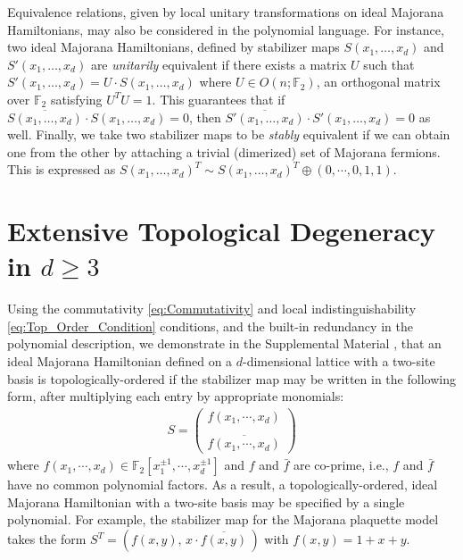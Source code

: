 \documentclass[aps,twocolumn,preprintnumbers,floatfix,showpacs,prx]{revtex4-1}
\begin{document}
Equivalence relations, given by local unitary transformations on ideal Majorana Hamiltonians,
may also be considered in the polynomial language.
For instance, two ideal Majorana Hamiltonians,
defined by stabilizer maps $S(x_1,\ldots,x_d)$ and $S'(x_1,\ldots,x_d)$
are \emph{unitarily} equivalent if there exists a matrix $U$
such that $S'(x_1,\ldots,x_d) = U \cdot S(x_1,\ldots,x_d)$
where $U \in O(n; \mathbb{F}_{2})$, an orthogonal matrix over $\mathbb{F}_{2}$
satisfying $U^T U = 1$.
This guarantees that if $\overline{S(x_{1},\ldots,x_{d})} \cdot S(x_{1},\ldots,x_{d}) = 0$,
then $\overline{S'(x_{1},\ldots,x_{d})}\cdot S'(x_{1},\ldots,x_{d}) = 0$ as well.
Finally, we take two stabilizer maps to be \emph{stably} equivalent
if we can obtain one from the other by attaching a trivial (dimerized) set of Majorana fermions.
This is expressed as $S(x_{1},\ldots,x_{d})^{T} \sim S(x_{1},\ldots,x_{d})^{T} \oplus \left(0,\cdots,0,1,1\right)$.


\section{Extensive Topological Degeneracy in $d \ge 3$}
\label{sec:extensive}

Using the commutativity \eqref{eq:Commutativity} and local indistinguishability \eqref{eq:Top_Order_Condition} conditions,
and the built-in redundancy in the polynomial description,
we demonstrate in the Supplemental Material \cite{Supp_Mat},
that an ideal Majorana Hamiltonian defined on a $d$-dimensional lattice with a two-site basis is topologically-ordered
if the stabilizer map may be written in the following form, 
after multiplying each entry by appropriate monomials:
\begin{align}\label{eq:Two_Site_Stabilizer}
S = \begin{pmatrix}
f(x_{1},\cdots, x_{d})\\\\
 \overline{f(x_{1},\cdots, x_{d})}
\end{pmatrix}
\end{align}
where $f(x_1,\cdots, x_d)\in\mathbb{F}_{2}[x_1^{\pm1},\cdots,x_d^{\pm1}]$ and $f$ and $\bar{f}$ are co-prime,
i.e., $f$ and $\bar{f}$ have no common polynomial factors.
As a result, a topologically-ordered, ideal Majorana Hamiltonian
with a two-site basis may be specified by a single polynomial.
For example, the stabilizer map for the Majorana plaquette model
takes the form $S^{T} = (f(x,y), \,x\cdot \overline{f(x,y)}\,)$ with $f(x,y) = 1 + x + y$.  
\end{document}
